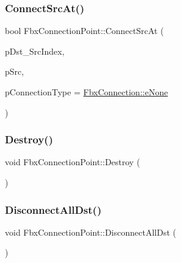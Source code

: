 \mbox{\label{class_fbx_connection_point_a51d906d43b8596a3cf021ff2a37a35c3}} 
\subsubsection{\texorpdfstring{Connect\+Src\+At()}{ConnectSrcAt()}}
{\footnotesize\ttfamily bool Fbx\+Connection\+Point\+::\+Connect\+Src\+At (\begin{DoxyParamCaption}\item[{int}]{p\+Dst\+\_\+\+Src\+Index,  }\item[{\hyperlink{class_fbx_connection_point}{Fbx\+Connection\+Point} $\ast$}]{p\+Src,  }\item[{\hyperlink{class_fbx_connection_a3df448a5db356652ab99fd2be2553749}{Fbx\+Connection\+::\+E\+Type}}]{p\+Connection\+Type = {\ttfamily \hyperlink{class_fbx_connection_a3df448a5db356652ab99fd2be2553749a47aa04870c3c0769263e3972e67e9ebe}{Fbx\+Connection\+::e\+None}} }\end{DoxyParamCaption})}

\mbox{\label{class_fbx_connection_point_a7876b4333d80ee35bef564a461b23003}} 
\subsubsection{\texorpdfstring{Destroy()}{Destroy()}}
{\footnotesize\ttfamily void Fbx\+Connection\+Point\+::\+Destroy (\begin{DoxyParamCaption}{ }\end{DoxyParamCaption})}

\mbox{\label{class_fbx_connection_point_abae6ad96d1a36e83d2eb870ca121b885}} 
\subsubsection{\texorpdfstring{Disconnect\+All\+Dst()}{DisconnectAllDst()}}
{\footnotesize\ttfamily void Fbx\+Connection\+Point\+::\+Disconnect\+All\+Dst (\begin{DoxyParamCaption}{ }\end{DoxyParamCaption})}

